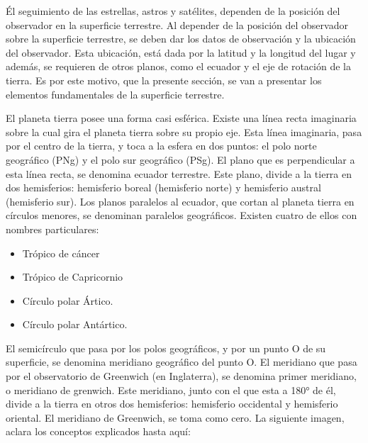 Él seguimiento de las estrellas, astros y satélites, dependen de la posición del observador en la superficie terrestre. Al depender de la posición del observador sobre la superficie terrestre, se deben dar los datos de observación y la ubicación del observador. Esta ubicación, está dada por la latitud y la longitud del lugar y además, se requieren de otros planos, como el ecuador y el eje de rotación de la tierra. Es por este motivo, que la presente sección, se van a presentar los elementos fundamentales de la superficie terrestre. 

El planeta tierra posee una forma casi esférica. Existe una línea recta imaginaria sobre la cual gira el planeta tierra sobre su propio eje. Esta línea imaginaria, pasa por el centro de la tierra, y toca a la esfera en dos puntos: el polo norte geográfico (PNg) y el polo sur geográfico (PSg). El plano que es perpendicular a esta línea recta, se denomina ecuador terrestre. Este plano, divide a la tierra en dos hemisferios: hemisferio boreal (hemisferio norte) y hemisferio austral (hemisferio sur). Los planos paralelos al ecuador, que cortan al planeta tierra en círculos menores, se denominan paralelos geográficos. Existen cuatro de ellos con nombres particulares:

\begin{itemize}
	\item Trópico de cáncer 
	\item Trópico de Capricornio 
	\item Círculo polar Ártico. 
	\item Círculo polar Antártico. 
\end{itemize}

El semicírculo que pasa por los polos geográficos, y por un punto O de su superficie, se denomina meridiano geográfico del punto O. El meridiano que pasa por el observatorio de Greenwich (en Inglaterra), se denomina primer meridiano, o meridiano de grenwich. Este meridiano, junto con el que esta a 180° de él, divide a la tierra en otros dos hemisferios: hemisferio occidental y hemisferio oriental. El meridiano de Greenwich, se toma como cero. La siguiente imagen, aclara los conceptos explicados hasta aquí:
 
